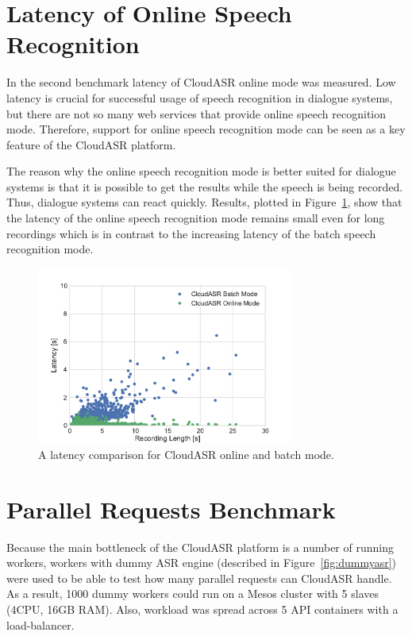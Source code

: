 \section{Latency of Online Speech Recognition}
In the second benchmark latency of CloudASR online mode was measured.
Low latency is crucial for successful usage of speech recognition in dialogue systems,
  but there are not so many web services that provide online speech recognition mode.
Therefore, support for online speech recognition mode can be seen as a key feature of the CloudASR platform.

The reason why the online speech recognition mode is better suited for dialogue systems is
  that it is possible to get the results while the speech is being recorded.
Thus, dialogue systems can react quickly.
Results, plotted in Figure~\ref{fig:online-benchmark}, show that
  the latency of the online speech recognition mode remains small even for long recordings
  which is in contrast to the increasing latency of the batch speech recognition mode.

\begin{figure}[h]
  \centering
  \includegraphics[width=0.75\textwidth]{./img/online.pdf}

  \caption{
    A latency comparison for CloudASR online and batch mode.
  }
  \label{fig:online-benchmark}
\end{figure}


\section{Parallel Requests Benchmark}
Because the main bottleneck of the CloudASR platform is a number of running workers,
  workers with dummy ASR engine (described in Figure~\ref{fig:dummyasr}) were used to be able to test how many parallel requests can CloudASR handle.
As a result, 1000 dummy workers could run on a Mesos cluster with 5 slaves (4CPU, 16GB RAM).
Also, workload was spread across 5 API containers with a load-balancer.

